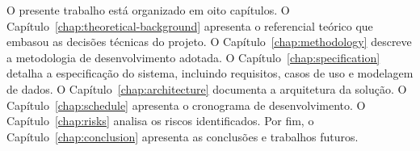 O presente trabalho está organizado em oito capítulos. O
Capítulo~\ref{chap:theoretical-background} apresenta o
referencial teórico que embasou as decisões técnicas do projeto.
O Capítulo~\ref{chap:methodology} descreve a metodologia de
desenvolvimento adotada. O Capítulo~\ref{chap:specification}
detalha a especificação do sistema, incluindo requisitos,
casos de uso e modelagem de dados. O
Capítulo~\ref{chap:architecture} documenta a arquitetura
da solução. O Capítulo~\ref{chap:schedule} apresenta o
cronograma de desenvolvimento. O Capítulo~\ref{chap:risks}
analisa os riscos identificados. Por fim, o
Capítulo~\ref{chap:conclusion} apresenta as conclusões e
trabalhos futuros.